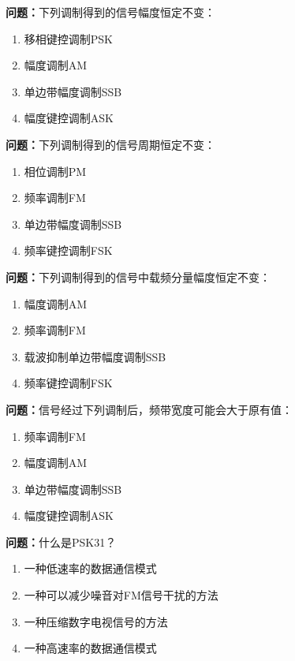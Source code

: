 \bigskip


\noindent\textbf{问题：}下列调制得到的信号幅度恒定不变：
\begin{enumerate}[label=\Alph*), leftmargin=3em]
\item 移相键控调制PSK
\item 幅度调制AM
\item 单边带幅度调制SSB
\item 幅度键控调制ASK
\end{enumerate}

\bigskip


\noindent\textbf{问题：}下列调制得到的信号周期恒定不变：
\begin{enumerate}[label=\Alph*), leftmargin=3em]
\item 相位调制PM
\item 频率调制FM
\item 单边带幅度调制SSB
\item 频率键控调制FSK
\end{enumerate}

\bigskip


\noindent\textbf{问题：}下列调制得到的信号中载频分量幅度恒定不变：
\begin{enumerate}[label=\Alph*), leftmargin=3em]
\item 幅度调制AM
\item 频率调制FM
\item 载波抑制单边带幅度调制SSB
\item 频率键控调制FSK
\end{enumerate}

\bigskip


\noindent\textbf{问题：}信号经过下列调制后，频带宽度可能会大于原有值：
\begin{enumerate}[label=\Alph*), leftmargin=3em]
\item 频率调制FM
\item 幅度调制AM
\item 单边带幅度调制SSB
\item 幅度键控调制ASK
\end{enumerate}

\bigskip


\noindent\textbf{问题：}什么是PSK31？
\begin{enumerate}[label=\Alph*), leftmargin=3em]
\item 一种低速率的数据通信模式
\item 一种可以减少噪音对FM信号干扰的方法
\item 一种压缩数字电视信号的方法
\item 一种高速率的数据通信模式
\end{enumerate}

